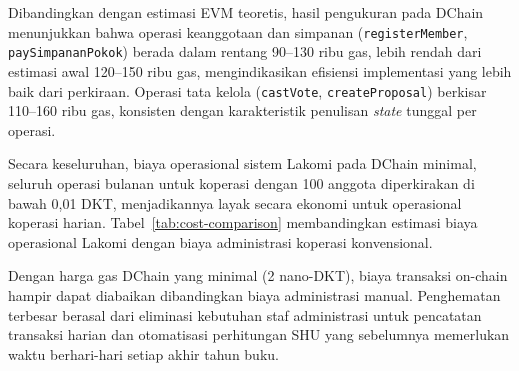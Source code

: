 Dibandingkan dengan estimasi EVM teoretis, hasil pengukuran pada DChain menunjukkan bahwa operasi keanggotaan dan simpanan (\texttt{registerMember}, \texttt{paySimpananPokok}) berada dalam rentang 90--130 ribu gas, lebih rendah dari estimasi awal 120--150 ribu gas, mengindikasikan efisiensi implementasi yang lebih baik dari perkiraan. Operasi tata kelola (\texttt{castVote}, \texttt{createProposal}) berkisar 110--160 ribu gas, konsisten dengan karakteristik penulisan \textit{state} tunggal per operasi.

Secara keseluruhan, biaya operasional sistem Lakomi pada DChain minimal, seluruh operasi bulanan untuk koperasi dengan 100 anggota diperkirakan di bawah 0,01 DKT, menjadikannya layak secara ekonomi untuk operasional koperasi harian. Tabel~\ref{tab:cost-comparison} membandingkan estimasi biaya operasional Lakomi dengan biaya administrasi koperasi konvensional.

\begin{table}[H]
\centering
\caption{Perbandingan Biaya Operasional: Lakomi vs Koperasi Konvensional}
\label{tab:cost-comparison}
\small
{}
\end{table}

Dengan harga gas DChain yang minimal (2 nano-DKT), biaya transaksi on-chain hampir dapat diabaikan dibandingkan biaya administrasi manual. Penghematan terbesar berasal dari eliminasi kebutuhan staf administrasi untuk pencatatan transaksi harian dan otomatisasi perhitungan SHU yang sebelumnya memerlukan waktu berhari-hari setiap akhir tahun buku.

